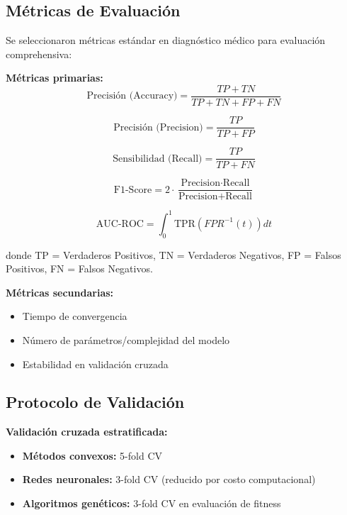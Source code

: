 \documentclass[12pt,a4paper]{article}
\begin{document}
\subsection{Métricas de Evaluación}

Se seleccionaron métricas estándar en diagnóstico médico para evaluación comprehensiva:

\textbf{Métricas primarias:}
\begin{equation}
\text{Precisión (Accuracy)} = \frac{TP + TN}{TP + TN + FP + FN}
\end{equation}

\begin{equation}
\text{Precisión (Precision)} = \frac{TP}{TP + FP}
\end{equation}

\begin{equation}
\text{Sensibilidad (Recall)} = \frac{TP}{TP + FN}
\end{equation}

\begin{equation}
\text{F1-Score} = 2 \cdot \frac{\text{Precision} \cdot \text{Recall}}{\text{Precision} + \text{Recall}}
\end{equation}

\begin{equation}
\text{AUC-ROC} = \int_0^1 \text{TPR}(FPR^{-1}(t)) dt
\end{equation}

donde TP = Verdaderos Positivos, TN = Verdaderos Negativos, FP = Falsos Positivos, FN = Falsos Negativos.

\textbf{Métricas secundarias:}
\begin{itemize}
    \item Tiempo de convergencia
    \item Número de parámetros/complejidad del modelo
    \item Estabilidad en validación cruzada
\end{itemize}

\subsection{Protocolo de Validación}

\textbf{Validación cruzada estratificada:}
\begin{itemize}
    \item \textbf{Métodos convexos:} 5-fold CV
    \item \textbf{Redes neuronales:} 3-fold CV (reducido por costo computacional)
    \item \textbf{Algoritmos genéticos:} 3-fold CV en evaluación de fitness
\end{itemize}
\end{document}
